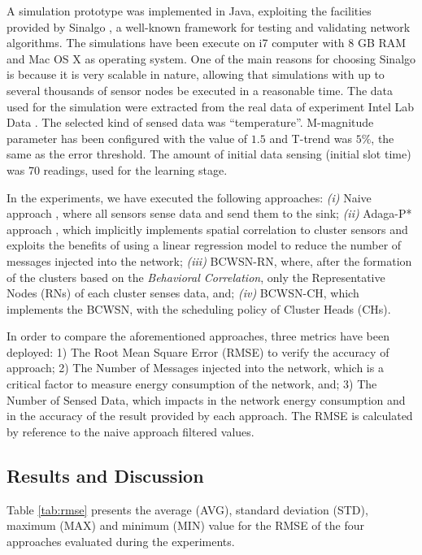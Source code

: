 \documentclass[conference]{IEEEtran}
\begin{document}
A simulation prototype was implemented in Java, exploiting the facilities
provided by Sinalgo \cite{Sinalgo2007}, a well-known framework for testing and
validating network algorithms. The simulations have been execute on i7 computer
with 8 GB RAM and Mac OS X as operating system.
One of the main reasons for choosing Sinalgo is because it is very scalable in
nature, allowing that simulations with up to several thousands of sensor nodes
be executed in a reasonable time. The data used for the simulation were
extracted from the real data of experiment Intel Lab Data \cite{Intel2004}. The
selected kind of sensed data was ``temperature''. M-magnitude parameter has been
configured with the value of $1.5$ and T-trend was $5\%$, the same as the error
threshold. The amount of initial data sensing (initial slot time) was 70
readings, used for the learning stage.

In the experiments, we have executed the following approaches: {\it
  (i)} Naive approach \cite{Madden2005}, where all sensors sense data
and send them to the sink;  {\it
  (ii)} Adaga-P* approach \cite{MaiaACR2013} \cite{MaiaSAC2013}, which
implicitly implements spatial correlation to cluster sensors and exploits the
benefits of using a linear  regression model to reduce the number of messages
injected into the network;  {\it
  (iii)} BCWSN-RN, where, after the formation of the clusters based on the
\textit{Behavioral Correlation}, only the Representative Nodes (RNs) of each
cluster senses data, and;  {\it
  (iv)} BCWSN-CH, which implements the BCWSN, with the scheduling
policy  of  Cluster Heads (CHs).

In order to compare the aforementioned approaches, three metrics have been
deployed: 1) The Root Mean Square Error (RMSE)  to verify the accuracy of
approach; 2) The Number of Messages injected into the network, which is a
critical factor to measure energy consumption of the network, and; 3) The
Number of Sensed Data, which impacts in the network energy consumption and in
the accuracy of the result provided by each approach. The RMSE is calculated by
reference to the naive approach filtered values.

\subsection{Results and Discussion}
\label{results-and-discussion}


Table \ref{tab:rmse} presents the average (AVG), standard deviation (STD),
maximum (MAX) and minimum (MIN) value for the RMSE of the four approaches
evaluated during the experiments.
\end{document}
